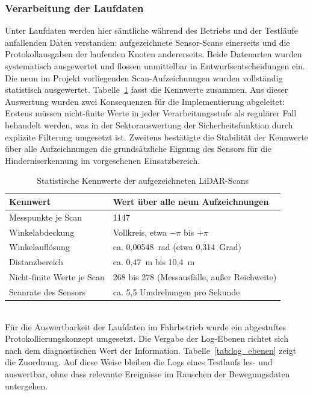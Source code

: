 \subsubsection{Verarbeitung der Laufdaten}
Unter Laufdaten werden hier sämtliche während des Betriebs und der Testläufe anfallenden Daten verstanden: aufgezeichnete Sensor-Scans einerseits und die Protokollausgaben der laufenden Knoten andererseits. Beide Datenarten wurden systematisch ausgewertet und flossen unmittelbar in Entwurfsentscheidungen ein.
\\
Die neun im Projekt vorliegenden Scan-Aufzeichnungen wurden vollständig statistisch ausgewertet. Tabelle~\ref{tab:scan_kennwerte} fasst die Kennwerte zusammen. Aus dieser Auswertung wurden zwei Konsequenzen für die Implementierung abgeleitet: Erstens müssen nicht-finite Werte in jeder Verarbeitungsstufe als regulärer Fall behandelt werden, was in der Sektorauswertung der Sicherheitsfunktion durch explizite Filterung umgesetzt ist. Zweitens bestätigte die Stabilität der Kennwerte über alle Aufzeichnungen die grundsätzliche Eignung des Sensors für die Hinderniserkennung im vorgesehenen Einsatzbereich.
\begin{table}[h!]
    \centering
    \small
    \begin{tabular}{p{6.2cm} p{8.2cm}}
        \toprule
        \textbf{Kennwert}          & \textbf{Wert über alle neun Aufzeichnungen}  \\
        \midrule
        Messpunkte je Scan         & 1147                                         \\
        Winkelabdeckung            & Vollkreis, etwa $-\pi$ bis $+\pi$            \\
        Winkelauflösung            & ca. 0,00548~rad (etwa 0,314~Grad)            \\
        Distanzbereich             & ca. 0,47~m bis 10,4~m                        \\
        Nicht-finite Werte je Scan & 268 bis 278 (Messausfälle, außer Reichweite) \\
        Scanrate des Sensors       & ca. 5,5 Umdrehungen pro Sekunde              \\
        \bottomrule
    \end{tabular}
    \caption{Statistische Kennwerte der aufgezeichneten LiDAR-Scans}
    \label{tab:scan_kennwerte}
\end{table}
\\
Für die Auswertbarkeit der Laufdaten im Fahrbetrieb wurde ein abgestuftes Protokollierungskonzept umgesetzt. Die Vergabe der Log-Ebenen richtet sich nach dem diagnostischen Wert der Information. Tabelle~\ref{tab:log_ebenen} zeigt die Zuordnung. Auf diese Weise bleiben die Logs eines Testlaufs les- und auswertbar, ohne dass relevante Ereignisse im Rauschen der Bewegungsdaten untergehen.
